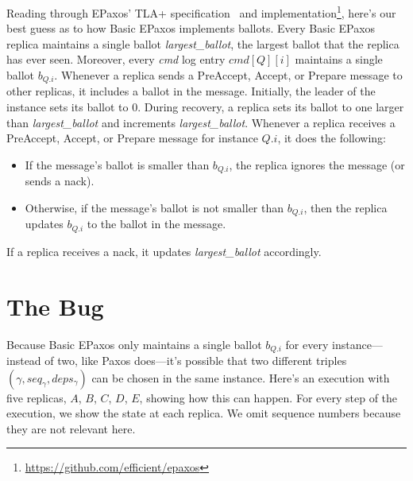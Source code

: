 \documentclass{mwhittaker}
\newcommand{\TLAplus}{TLA+}
\begin{document}
\newcommand{\largestBallot}{\textit{largest\_ballot}}
\newcommand{\cmd}{\textit{cmd}}
Reading through EPaxos' \TLAplus{} specification~\cite{moraru2013proof} and
implementation\footnote{\url{https://github.com/efficient/epaxos}}, here's our
best guess as to how Basic EPaxos implements ballots. Every Basic EPaxos
replica maintains a single ballot \largestBallot{}, the largest ballot that the
replica has ever seen. Moreover, every \cmd{} log entry $\cmd[Q][i]$ maintains
a single ballot $b_{Q.i}$. Whenever a replica sends a PreAccept, Accept, or
Prepare message to other replicas, it includes a ballot in the message.
Initially, the leader of the instance sets its ballot to $0$. During recovery,
a replica sets its ballot to one larger than \largestBallot{} and increments
\largestBallot{}. Whenever a replica receives a PreAccept, Accept, or Prepare
message for instance $Q.i$, it does the following:
\begin{itemize}
  \item
    If the message's ballot is smaller than $b_{Q.i}$, the replica ignores the
    message (or sends a nack).
  \item
    Otherwise, if the message's ballot is not smaller than $b_{Q.i}$, then the
    replica updates $b_{Q.i}$ to the ballot in the message.
\end{itemize}
If a replica receives a nack, it updates \largestBallot{} accordingly.

\section{The Bug}
Because Basic EPaxos only maintains a single ballot $b_{Q.i}$ for every
instance---instead of two, like Paxos does---it's possible that two different
triples $(\gamma, seq_\gamma, deps_\gamma)$ can be chosen in the same instance.
Here's an execution with five replicas, $A$, $B$, $C$, $D$, $E$, showing how
this can happen. For every step of the execution, we show the state at each
replica. We omit sequence numbers because they are not relevant here.
\end{document}
